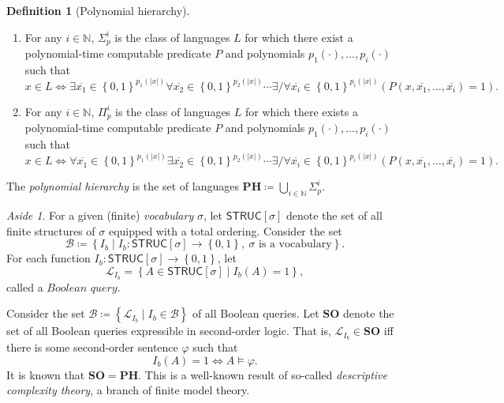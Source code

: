 \documentclass[10pt,letterpaper,cm]{nupset}
\theoremstyle{definition}
\newtheorem{definition}{Definition}[subsection]
\theoremstyle{theorem}
\theoremstyle{remark}
\newtheorem*{aside}{Aside}
\newcommand{\N}{\mathbb N}
\newcommand{\1}{\mathbf{1}}
\newcommand{\0}{\vec 0}
\begin{document}
\begin{definition}[Polynomial hierarchy]  $ $
\begin{enumerate}
\item For any $i \in \N$, $\Sigma_p^i$ is the class of languages $L$ for which there exist a polynomial-time computable predicate $P$ and polynomials $p_1({\cdot}), \ldots, p_i({\cdot})$ such that $$x \in L \iff \exists \overline{x_1}\in \left\{0,1\right\}^{p_1(\left\lvert{x}\right\rvert)} \forall \overline{x_2} \in  \left\{0,1\right\}^{p_2(\left\lvert{x}\right\rvert)}\cdots \exists /\forall \overline{x_i}\in \left\{0,1\right\}^{p_i(\left\lvert{x}\right\rvert)}\left(P(x, \overline{x_1}, \ldots, \overline{x_i}) =1\right).$$  
\item For any $i \in \N$, $\Pi_p^i$ is the class of languages $L$ for which there exists a polynomial-time computable predicate $P$ and polynomials $p_1({\cdot}), \ldots, p_i({\cdot})$ such that $$x \in L \iff \forall \overline{x_1}\in \left\{0,1\right\}^{p_1(\left\lvert{x}\right\rvert)} \exists \overline{x_2} \in  \left\{0,1\right\}^{p_2(\left\lvert{x}\right\rvert)}\cdots \exists /\forall \overline{x_i}\in \left\{0,1\right\}^{p_i(\left\lvert{x}\right\rvert)}\left(P(x, \overline{x_1}, \ldots, \overline{x_i}) =1\right).$$  
\end{enumerate}
The \textit{polynomial hierarchy} is the set of languages $\mathbf{PH} \coloneqq \bigcup_{i\in \N}\Sigma_p^i$.
\end{definition}

\begin{aside}
For a given (finite) \textit{vocabulary} $\sigma$, let $\mathsf{STRUC}[\sigma]$ denote the set of all  finite structures of $\sigma$ equipped with a total ordering. Consider the set $$\mathcal{B} \coloneqq \left\{I_b \mid I_b :   \mathsf{STRUC}[\sigma] \to \left\{0,1\right\},\  \sigma \text{ is a vocabulary}\right\}.$$ For each  function $I_b :  \mathsf{STRUC}[\sigma] \to \left\{0,1\right\}$, let $$\mathcal{L}_{I_b} = \left\{A \in \mathsf{STRUC}[\sigma] \mid I_b(A) = 1\right\},$$ called a $\textit{Boolean query}$. 

Consider the set $\mathcal{B} \coloneqq \left\{ \mathcal{L}_{I_b} \mid I_b \in \mathcal{B}\right\}$ of all Boolean queries. Let $\mathbf{SO}$ denote the set of all Boolean queries expressible in second-order logic. That is, $\mathcal{L}_{I_b} \in \mathbf{SO}$ iff there is some second-order sentence $\varphi$ such that $$I_b(A) =1 \iff A \models \varphi.$$ It is known that $\mathbf{SO} = \mathbf{PH}$. This is a well-known result of so-called \textit{descriptive complexity theory}, a branch of finite model theory.
\end{aside}
\end{document}
